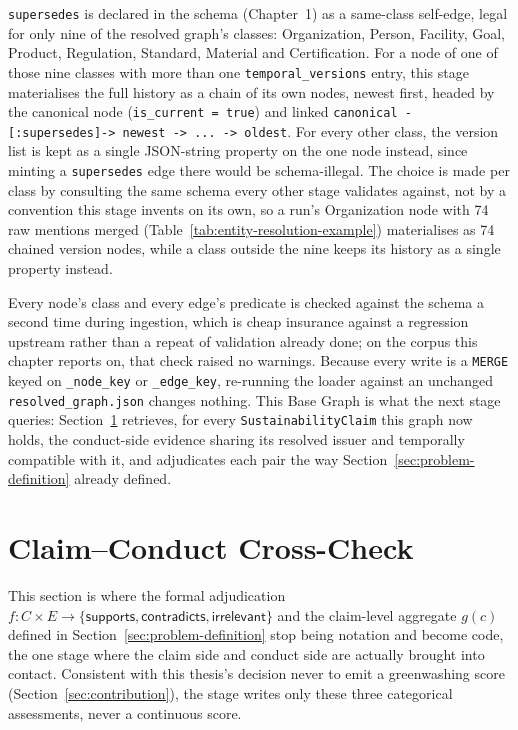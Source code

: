\documentclass[fontsize=12pt,oneside,headings=small]{scrreprt}
\begin{document}
\texttt{supersedes} is declared in the schema (Chapter~1) as a same-class self-edge, legal for only nine of the resolved graph's classes: Organization, Person, Facility, Goal, Product, Regulation, Standard, Material and Certification. For a node of one of those nine classes with more than one \texttt{temporal\_versions} entry, this stage materialises the full history as a chain of its own nodes, newest first, headed by the canonical node (\texttt{is\_current = true}) and linked \texttt{canonical -[:supersedes]-> newest -> ... -> oldest}. For every other class, the version list is kept as a single JSON-string property on the one node instead, since minting a \texttt{supersedes} edge there would be schema-illegal. The choice is made per class by consulting the same schema every other stage validates against, not by a convention this stage invents on its own, so a run's Organization node with 74 raw mentions merged (Table~\ref{tab:entity-resolution-example}) materialises as 74 chained version nodes, while a class outside the nine keeps its history as a single property instead.

Every node's class and every edge's predicate is checked against the schema a second time during ingestion, which is cheap insurance against a regression upstream rather than a repeat of validation already done; on the corpus this chapter reports on, that check raised no warnings. Because every write is a \texttt{MERGE} keyed on \texttt{\_node\_key} or \texttt{\_edge\_key}, re-running the loader against an unchanged \texttt{resolved\_graph.json} changes nothing. This Base Graph is what the next stage queries: Section~\ref{sec:crosscheck} retrieves, for every \texttt{SustainabilityClaim} this graph now holds, the conduct-side evidence sharing its resolved issuer and temporally compatible with it, and adjudicates each pair the way Section~\ref{sec:problem-definition} already defined.

\section{Claim--Conduct Cross-Check}
\label{sec:crosscheck}

This section is where the formal adjudication $f: C \times E \rightarrow \{\textsf{supports}, \textsf{contradicts}, \textsf{irrelevant}\}$ and the claim-level aggregate $g(c)$ defined in Section~\ref{sec:problem-definition} stop being notation and become code, the one stage where the claim side and conduct side are actually brought into contact. Consistent with this thesis's decision never to emit a greenwashing score (Section~\ref{sec:contribution}), the stage writes only these three categorical assessments, never a continuous score.
\end{document}
